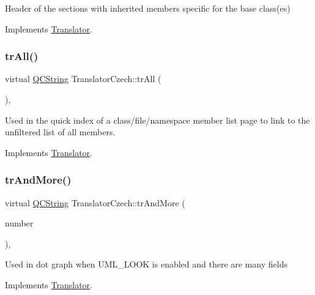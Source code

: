 Header of the sections with inherited members specific for the base class(es) 

Implements \mbox{\hyperlink{class_translator}{Translator}}.

\mbox{\label{class_translator_czech_ac85dbb937992350c03a8e236da3041b1}} 
\subsubsection{\texorpdfstring{trAll()}{trAll()}}
{\footnotesize\ttfamily virtual \mbox{\hyperlink{class_q_c_string}{Q\+C\+String}} Translator\+Czech\+::tr\+All (\begin{DoxyParamCaption}{ }\end{DoxyParamCaption})\hspace{0.3cm}{\ttfamily [inline]}, {\ttfamily [virtual]}}

Used in the quick index of a class/file/namespace member list page to link to the unfiltered list of all members. 

Implements \mbox{\hyperlink{class_translator}{Translator}}.

\mbox{\label{class_translator_czech_a3925eedadc2e79f8d8ede9e0d2fc3d7f}} 
\subsubsection{\texorpdfstring{trAndMore()}{trAndMore()}}
{\footnotesize\ttfamily virtual \mbox{\hyperlink{class_q_c_string}{Q\+C\+String}} Translator\+Czech\+::tr\+And\+More (\begin{DoxyParamCaption}\item[{const \mbox{\hyperlink{class_q_c_string}{Q\+C\+String}} \&}]{number }\end{DoxyParamCaption})\hspace{0.3cm}{\ttfamily [inline]}, {\ttfamily [virtual]}}

Used in dot graph when U\+M\+L\+\_\+\+L\+O\+OK is enabled and there are many fields 

Implements \mbox{\hyperlink{class_translator}{Translator}}.

\mbox{\label{class_translator_czech_adef3362cee69f543048b0e08b400fcad}} 
